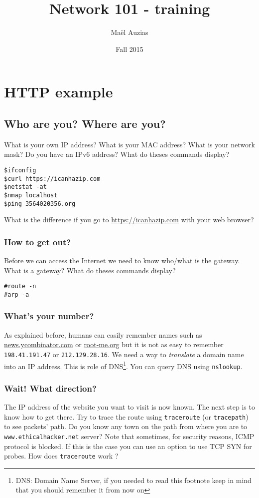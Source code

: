 \documentclass[11pt]{article}
\begin{document}
\title{Network 101 - training}
\date{Fall 2015}
\author{Maël Auzias}
\maketitle

\tableofcontents
\pagebreak


\section{HTTP example}
\subsection{Who are you? Where are you?}
What is your own IP address? What is your MAC address? What is your network mask? Do you have an IPv6 address?
What do theses commands display?
\begin{verbatim}
$ifconfig
$curl https://icanhazip.com
$netstat -at
$nmap localhost
$ping 3564020356.org
\end{verbatim}
What is the difference if you go to \color{blue}\href{https://icanhazip.com}{https://icanhazip.com}\color{black} with your web browser?

\subsubsection{How to get out?}
Before we can access the Internet we need to know who/what is the gateway. What is a gateway?
What do theses commands display?
\begin{verbatim}
#route -n
#arp -a
\end{verbatim}

\subsubsection{What's your number?}
As explained before, humans can easily remember names such as \color{blue}\href{https://news.ycombinator.com}{news.ycombinator.com}\color{black} or \color{blue}\href{http://root-me.org}{root-me.org}\color{black} but it is not as easy to remember \verb"198.41.191.47" or \verb"212.129.28.16". We need a way to \emph{translate} a domain name into an IP address. This is role of DNS\footnote{DNS: Domain Name Server, if you needed to read this footnote keep in mind that you should remember it from now on}. You can query DNS using \verb"nslookup".

\subsubsection{Wait! What direction?}
The IP address of the website you want to visit is now known. The next step is to know how to get there. Try to trace the route using \verb"traceroute" (or \verb"tracepath") to see packets' path. Do you know any town on the path from where you are to \verb"www.ethicalhacker.net" server?
Note that sometimes, for security reasons, ICMP protocol is blocked. If this is the case you can use an option to use TCP SYN for probes.
How does \verb"traceroute" work ?
\end{document}

